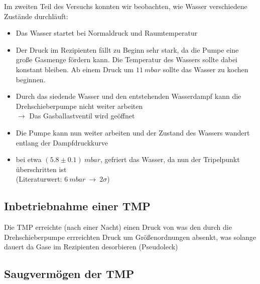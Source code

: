 \documentclass[12pt, a4paper]{scrartcl}
\begin{document}
        Im zweiten Teil des Versuchs konnten wir beobachten, wie Wasser verschiedene Zustände durchläuft:
        
        \begin{itemize}
            \item Das Wasser startet bei Normaldruck und Raumtemperatur
            
            \item Der Druck im Rezipienten fällt zu Beginn sehr stark, da die Pumpe eine große Gasmenge fördern kann. Die Temperatur des Wassers sollte dabei konstant bleiben. Ab einem Druck um $11\ mbar$ sollte das Wasser zu kochen beginnen.
            
            \item Durch das siedende Wasser und den entstehenden Wasserdampf kann die Drehschieberpumpe nicht weiter arbeiten\\
            $\rightarrow$ Das Gasballastventil wird geöffnet
            
            \item Die Pumpe kann nun weiter arbeiten und der Zustand des Wassers wandert entlang der Dampfdruckkurve
            
            \item bei etwa $(5.8\pm0.1)\ mbar$, gefriert das Wasser, da nun der Tripelpunkt überschritten ist\\(Literaturwert: $6\ mbar\ \rightarrow\ 2\sigma$)
        \end{itemize}

    \subsection{Inbetriebnahme einer TMP}
    
        Die TMP erreichte (nach einer Nacht) einen Druck von 
        was den durch die Drehschieberpumpe errreichten Druck um 
        Größenordnungen absenkt, was solange dauert da Gase im Rezipienten desorbieren (Pseudoleck)
        
    \subsection{Saugvermögen der TMP}
        
\end{document}
